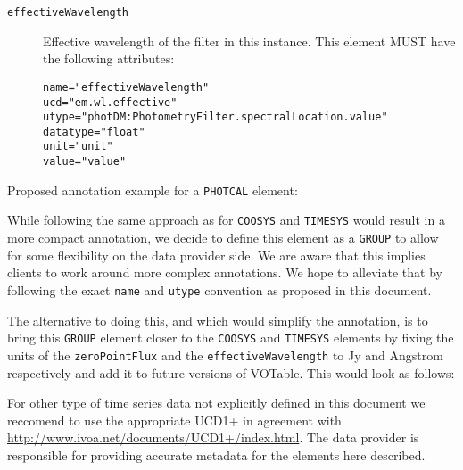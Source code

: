\documentclass[11pt,a4paper]{ivoa}
\let\fg=\color
\def\attr#1{{\tt{\fg{DarkRed}#1}}}
\def\elem#1{{\tt{\fg{DarkRed}#1}}}
\def\attrval#1#2{{\tt{\fg{DarkRed}#1}="{\fg{DarkPurple}#2}"}}
\begin{document}
\begin{description}
\item[\elem{effectiveWavelength}] Effective wavelength of the filter in this instance. This element MUST have the following attributes:
\begin{description}
    \item[\attrval{name}{effectiveWavelength}]
    \item[\attrval{ucd}{em.wl.effective}]
    \item[\attrval{utype}{photDM:PhotometryFilter.spectralLocation.value}] 
    \item[\attrval{datatype}{float}]
    \item[\attrval{unit}{unit}]
    \item[\attrval{value}{value}]
\end{description}
\end{description}

Proposed annotation example for a \elem{PHOTCAL} element: 



While following the same approach as for \elem{COOSYS} and \elem{TIMESYS} would result in a more compact annotation, we decide to define this element as a \elem{GROUP} to allow for some flexibility on the data provider side. We are aware that this implies clients to work around more complex annotations. We hope to alleviate that by following the exact \attr{name} and \attr{utype} convention as proposed in this document.

The alternative to doing this, and which would simplify the annotation, is to bring this \elem{GROUP} element closer to the \elem{COOSYS} and \elem{TIMESYS} elements by fixing the units of the \attr{zeroPointFlux} and the \attr{effectiveWavelength} to Jy and Angstrom respectively and add it to future versions of VOTable. This would look as follows: 




%

For other type of time series data not explicitly defined in this document we reccomend to use the appropriate UCD1+ in agreement with \url{http://www.ivoa.net/documents/UCD1+/index.html}. The data provider is responsible for providing accurate metadata for the elements here described.


%
\end{document}

